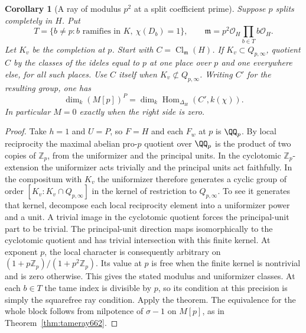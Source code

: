 \documentclass[a4paper,11pt]{article}
\newtheorem{corollary}[proposition]{Corollary}
\theoremstyle{definition}
\theoremstyle{remark}
\newcommand{\ZZ}{\mathbb Z}\newcommand{\ord}{\operatorname{ord}}
\numberwithin{equation}{section}
\newcommand{\Cl}{\operatorname{Cl}}
\begin{document}
\begin{corollary}[A ray of modulus \(p^2\) at a split coefficient prime]
\leavevmode\label{cor:splitray663}
Suppose \(p\) splits completely in \(H\). Put
\[
 T=\{b\ne p:b\text{ ramifies in }K,\ \chi(D_b)=1\},\qquad
 \mathfrak m=p^2\mathcal O_H\prod_{b\in T}b\mathcal O_H .
\]
Let \(K_v\) be the completion at \(p\). Start with
\(C=\Cl_{\mathfrak m}(H)\). If \(K_v\subset Q_{p,\infty}\),
quotient \(C\) by the classes of the ideles equal to \(p\)
at one place over \(p\) and one everywhere else, for all such
places. Use \(C\) itself when \(K_v\not\subset Q_{p,\infty}\).
Writing \(C'\) for the resulting group, one has
\[
             \dim_k (M[p])^P
            =\dim_k\operatorname{Hom}_{\Delta_H}(C',k(\chi)).
\]
In particular \(M=0\) exactly when the right side is zero.
\end{corollary}
\begin{proof}
Take \(h=1\) and \(U=P\), so \(F=H\) and each \(F_w\) at \(p\)
is \(\QQ_p\). By local reciprocity the maximal abelian pro-\(p\)
quotient over \(\QQ_p\) is the product of two copies of
\(\ZZ_p\), from the uniformizer and the principal units. In
the cyclotomic \(\ZZ_p\)-extension the uniformizer acts trivially
and the principal units act faithfully. In the compositum with
\(K_v\) the uniformizer therefore generates a cyclic group of
order \([K_v:K_v\cap Q_{p,\infty}]\) in the kernel of restriction
to \(Q_{p,\infty}\). To see it generates that kernel, decompose
each local reciprocity element into a uniformizer power and a
unit. A trivial image in the cyclotomic quotient forces the
principal-unit part to be trivial. The principal-unit direction
maps isomorphically to the cyclotomic quotient and has trivial
intersection with this finite kernel. At exponent \(p\), the
local character is consequently arbitrary on
\((1+p\ZZ_p)/(1+p^2\ZZ_p)\). Its value at \(p\) is free when
the finite kernel is nontrivial and is zero otherwise. This gives
the stated modulus and uniformizer classes. At each \(b\in T\)
the tame index is divisible by \(p\), so its condition at this
precision is simply the squarefree ray condition. Apply the
theorem. The equivalence for the whole block follows from
nilpotence of \(\sigma-1\) on \(M[p]\), as in
Theorem~\ref{thm:tameray662}.
\end{proof}
\end{document}
